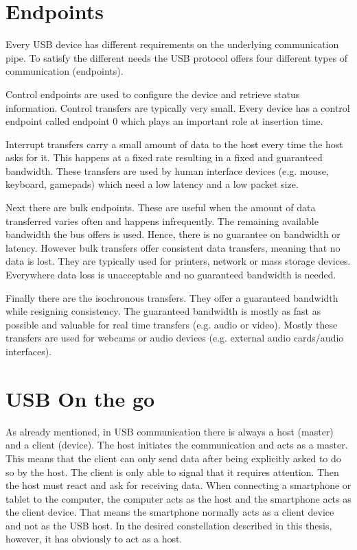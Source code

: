 \section{Endpoints}

Every USB device has different requirements on the underlying communication pipe. To satisfy the different needs the USB protocol offers four different types of communication (endpoints).

Control endpoints are used to configure the device and retrieve status information. Control transfers are typically very small. Every device has a control endpoint called endpoint 0 which plays an important role at insertion time\cite{free_usb}.

Interrupt transfers carry a small amount of data to the host every time the host asks for it. This happens at a fixed rate resulting in a fixed and guaranteed bandwidth. These transfers are used by human interface devices (e.g. mouse, keyboard, gamepads) which need a low latency and a low packet size.

Next there are bulk endpoints. These are useful when the amount of data transferred varies often and happens infrequently. The remaining available bandwidth the bus offers is used. Hence, there is no guarantee on bandwidth or latency. However bulk transfers offer consistent data transfers, meaning that no data is lost. They are typically used for printers, network or mass storage devices. Everywhere data loss is unacceptable and no guaranteed bandwidth is needed.

Finally there are the isochronous transfers. They offer a guaranteed bandwidth while resigning consistency. The guaranteed bandwidth is mostly as fast as possible and valuable for real time transfers (e.g. audio or video). Mostly these transfers are used for webcams or audio devices (e.g. external audio cards/audio interfaces)\cite{free_usb}.

\section{USB On the go}

As already mentioned, in USB communication there is always a host (master) and a client (device). The host initiates the communication and acts as a master. This means that the client can only send data after being explicitly asked to do so by the host. The client is only able to signal that it requires attention. Then the host must react and ask for receiving data. When connecting a smartphone or tablet to the computer, the computer acts as the host and the smartphone acts as the client device. That means the smartphone normally acts as a client device and not as the USB host. In the desired constellation described in this thesis, however, it has obviously to act as a host. 

